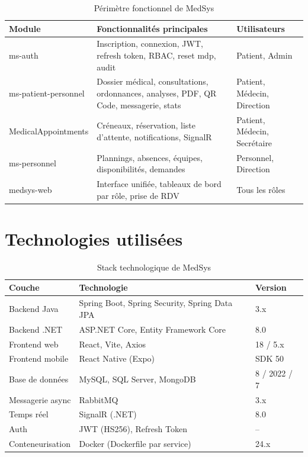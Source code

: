 \begin{table}[H]
\centering
\renewcommand{\arraystretch}{1.4}
\begin{tabularx}{\textwidth}{|l|X|l|}
\hline
\rowcolor{tabhead}\color{white}\textbf{Module} &
\color{white}\textbf{Fonctionnalités principales} &
\color{white}\textbf{Utilisateurs} \\
\hline
ms-auth & Inscription, connexion, JWT, refresh token, RBAC, reset mdp, audit &
Patient, Admin \\
\hline
\rowcolor{roweven}
ms-patient-personnel & Dossier médical, consultations, ordonnances, analyses, PDF,
QR Code, messagerie, stats & Patient, Médecin, Direction \\
\hline
MedicalAppointments & Créneaux, réservation, liste d'attente, notifications, SignalR &
Patient, Médecin, Secrétaire \\
\hline
\rowcolor{roweven}
ms-personnel & Plannings, absences, équipes, disponibilités, demandes &
Personnel, Direction \\
\hline
medsys-web & Interface unifiée, tableaux de bord par rôle, prise de RDV &
Tous les rôles \\
\hline
\end{tabularx}
\caption{Périmètre fonctionnel de MedSys}
\end{table}

\section{Technologies utilisées}

\begin{table}[H]
\centering
\renewcommand{\arraystretch}{1.4}
\begin{tabular}{|l|l|l|}
\hline
\rowcolor{tabhead}\color{white}\textbf{Couche} &
\color{white}\textbf{Technologie} &
\color{white}\textbf{Version} \\
\hline
Backend Java & Spring Boot, Spring Security, Spring Data JPA & 3.x \\
\rowcolor{roweven}
Backend .NET & ASP.NET Core, Entity Framework Core & 8.0 \\
Frontend web & React, Vite, Axios & 18 / 5.x \\
\rowcolor{roweven}
Frontend mobile & React Native (Expo) & SDK 50 \\
Base de données & MySQL, SQL Server, MongoDB & 8 / 2022 / 7 \\
\rowcolor{roweven}
Messagerie async & RabbitMQ & 3.x \\
Temps réel & SignalR (.NET) & 8.0 \\
\rowcolor{roweven}
Auth & JWT (HS256), Refresh Token & -- \\
Conteneurisation & Docker (Dockerfile par service) & 24.x \\
\hline
\end{tabular}
\caption{Stack technologique de MedSys}
\end{table}

